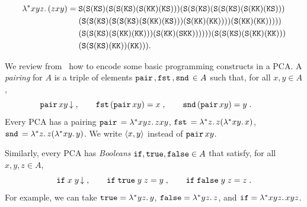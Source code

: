 \begin{equation*}
  \lambda^{*} x y z .\,(z x y) =
  \begin{aligned}[t]
  & {\mathtt{S}} (
    {\mathtt{S}} ({\mathtt{K}}{\mathtt{S}}) (
      {\mathtt{S}}({\mathtt{S}}({\mathtt{K}}{\mathtt{S}})({\mathtt{S}}({\mathtt{K}}{\mathtt{K}})({\mathtt{K}}{\mathtt{S}}))) (
        {\mathtt{S}} (
          {\mathtt{S}} ({\mathtt{K}}{\mathtt{S}}) (
            {\mathtt{S}}({\mathtt{S}}({\mathtt{K}}{\mathtt{S}})({\mathtt{S}}({\mathtt{K}}{\mathtt{K}})({\mathtt{K}}{\mathtt{S}}))) \\ & (
              {\mathtt{S}}({\mathtt{S}}({\mathtt{K}}{\mathtt{S}})({\mathtt{S}}({\mathtt{S}}({\mathtt{K}}{\mathtt{S}})({\mathtt{S}}({\mathtt{K}}{\mathtt{K}})({\mathtt{K}}{\mathtt{S}})))({\mathtt{S}}({\mathtt{K}}{\mathtt{K}})({\mathtt{K}}{\mathtt{K}}))))(
              {\mathtt{S}}({\mathtt{K}}{\mathtt{K}})({\mathtt{K}}{\mathtt{K}}))
            )
          )
        ) \\ &
   (
          {\mathtt{S}}({\mathtt{S}}({\mathtt{K}}{\mathtt{S}})({\mathtt{S}}({\mathtt{K}}{\mathtt{K}})({\mathtt{K}}{\mathtt{K}})))({\mathtt{S}}({\mathtt{K}}{\mathtt{K}})({\mathtt{S}}{\mathtt{K}}{\mathtt{K}}))
          )
      )
    )
  ) (
    {\mathtt{S}}({\mathtt{S}}({\mathtt{K}}{\mathtt{S}})({\mathtt{S}}({\mathtt{K}}{\mathtt{K}})({\mathtt{K}}{\mathtt{K}}))) \\ & ({\mathtt{S}}({\mathtt{S}}({\mathtt{K}}{\mathtt{S}})({\mathtt{K}}{\mathtt{K}}))({\mathtt{K}}{\mathtt{K}}))
  ).
  \end{aligned}
\end{equation*}
%

We review from~\cite[Chapter~1]{Longley:94} how to encode some basic programming
constructs in a PCA.
%
%
%
%
\label{sym:combPair}%
\label{sym:combFst}%
\label{sym:combSnd}%
%
A \emph{pairing} for $A$ is a triple of
elements $\mathtt{pair}\,, \mathtt{fst}\,, \mathtt{snd}\, \in A$ such that, for all
$x, y \in A$,
%
\begin{equation*}
  \mathtt{pair}\, x y \,{\downarrow}        \;,\qquad
  \mathtt{fst}\, (\mathtt{pair}\, x y) = x  \;,\qquad
  \mathtt{snd}\, (\mathtt{pair}\, x y) = y  \;.\qquad
\end{equation*}
%
Every PCA has a pairing $\mathtt{pair}\, = \lambda^{*} x y z .\,z x y$, $\mathtt{fst}\,
= \lambda^{*} z .\,z (\lambda^{*} x y .\,x)$, $\mathtt{snd}\, = \lambda^{*} z .\,z
  (\lambda^{*} x y .\,y)$. We write $\langle x, y \rangle$ instead of $\mathtt{pair}\, x
y$. 

Similarly, every PCA has
%
%
%
%
%
\label{sym:combIf}%
\label{sym:combTrue}%
\label{sym:combFalse}%
%
\emph{Booleans} $\mathtt{if}, \mathtt{true},
\mathtt{false} \in A$ that satisfy, for all $x, y, z \in A$,
%
\begin{equation*}
  \mathtt{if}\; x\; y \,{\downarrow} \;,\qquad
  \mathtt{if}\; \mathtt{true}\;  y\; z = y \;,\qquad
  \mathtt{if}\; \mathtt{false}\; y\; z = z \;.
\end{equation*}
%
For example, we can take $\mathtt{true} = \lambda^{*} y z .\,y$, $\mathtt{false} =
\lambda^{*} y z .\,z$, and $\mathtt{if} = \lambda^{*} x y z .\,x y z$.

